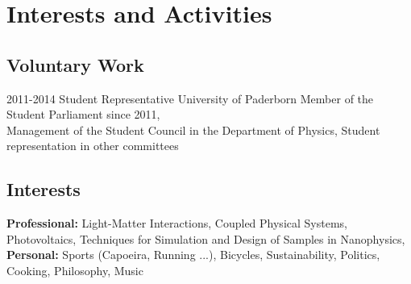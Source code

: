 \documentclass[10pt, print]{friggeri-cv}
\begin{document}
\section{Interests and Activities}


\subsection{Voluntary Work}
\begin{entrylist}
	\entry
	{2011-2014}
	{Student Representative}
	{University of Paderborn}
	{Member of the Student Parliament since 2011,\\ Management of the Student
    Council in the Department of Physics, Student representation in other
    committees}


\end{entrylist}



\subsection{Interests}
\textbf{Professional:} Light-Matter Interactions, Coupled Physical Systems,
Photovoltaics, Techniques for Simulation and Design of Samples in Nanophysics,
\textbf{Personal:} Sports (Capoeira, Running ...), Bicycles, Sustainability, Politics, Cooking, Philosophy, Music
\end{document}
